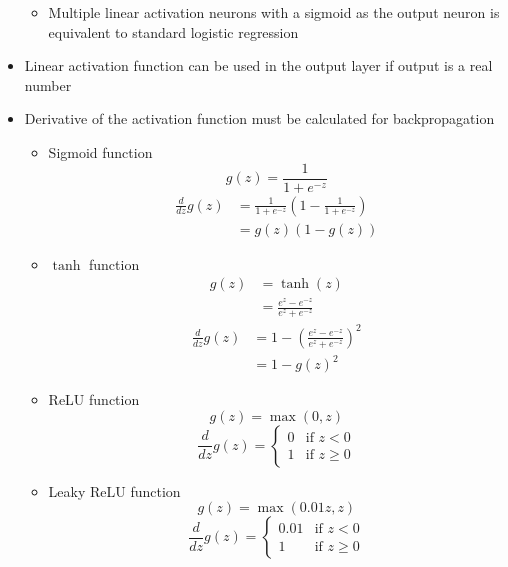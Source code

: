 \documentclass[12pt, letterpaper]{article}
\begin{document}
\begin{itemize}
\begin{itemize}
            \item Multiple linear activation neurons with a sigmoid as the output neuron is equivalent to standard logistic regression
        \end{itemize}
        \item Linear activation function can be used in the output layer if output is a real number
        \item Derivative of the activation function must be calculated for backpropagation
        \begin{itemize}
            \item Sigmoid function
            $$g(z)=\frac{1}{1+e^{-z}}$$
            \begin{align*}
                \frac{d}{dz}g(z)&=\frac{1}{1+e^{-z}}\left(1-\frac{1}{1+e^{-z}}\right) \\
                &=g(z)(1-g(z))
            \end{align*}
            \item $\tanh$ function
            \begin{align*}
            g(z)&=\tanh(z) \\
            &=\frac{e^z-e^{-z}}{e^z+e^{-z}}
            \end{align*}
            \begin{align*}
                \frac{d}{dz}g(z)&=1-\left(\frac{e^z-e^{-z}}{e^z+e^{-z}}\right)^2 \\
                &=1-g(z)^2
            \end{align*}
            \item ReLU function
            $$g(z)=\max(0,z)$$
            $$\frac{d}{dz}g(z)=\begin{cases}
                0 & \text{if } z < 0 \\
                1 & \text{if } z \geq 0
            \end{cases}$$
            \item Leaky ReLU function
            $$g(z)=\max(0.01z,z)$$
            $$\frac{d}{dz}g(z)=\begin{cases}
                0.01 & \text{if } z < 0 \\
                1 & \text{if } z \geq 0
            \end{cases}$$
        \end{itemize}

    \end{itemize}
\end{document}
